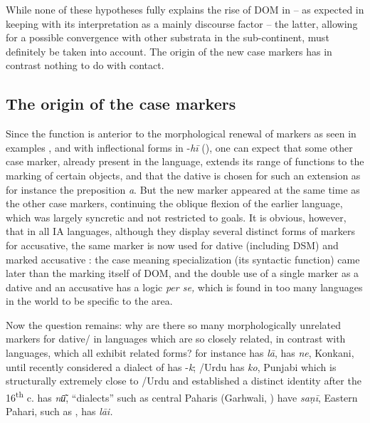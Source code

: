 \documentclass[output=paper]{LSP/langsci}
\begin{document}
While none of these hypotheses fully explains the rise of DOM in  – as expected in keeping with its interpretation as a mainly discourse factor – the latter, allowing for a possible convergence with other substrata in the sub-continent, must definitely be taken into account. The origin of the new case markers has in contrast nothing to do with contact.

\subsection{The origin of the case markers}
\label{10-mo-subsec:6.2}

Since the function is anterior to the morphological renewal of markers as seen in examples ,  and  with inflectional forms in -\textit{hī} (), one can expect that some other case marker, already present in the language, extends its range of functions to the marking of certain objects, and that the dative is chosen for such an extension as for instance the  preposition \textit{a}. But the new  marker appeared at the same time as the other case markers, continuing the oblique flexion of the earlier language, which was largely syncretic and not restricted to goals. It is obvious, however, that in all IA languages, although they display several distinct forms of markers for accusative, the same marker is now used for dative (including DSM) and marked accusative \citep{Krishnamurtietal1986South}: the case meaning specialization (its syntactic function) came later than the marking itself of DOM, and the double use of a single marker as a dative and an accusative has a logic \textit{per se,} which is found in too many languages in the world to be specific to the area. 

Now the question remains: why are there so many morphologically unrelated markers for dative/ in languages which are so closely related, in contrast with  languages, which all exhibit related forms?  for instance has \textit{lā},  has \textit{ne}, Konkani, until recently considered a dialect of  has -\textit{k}; /Urdu has \textit{ko}, Punjabi which is structurally extremely close to /Urdu and established a distinct identity after the 16\textsuperscript{th} c. has \textit{nū͂},  “dialects” such as central Paharis (Garhwali, ) have \textit{saṇī}, Eastern Pahari, such as , has \textit{lāi.}
\end{document}
